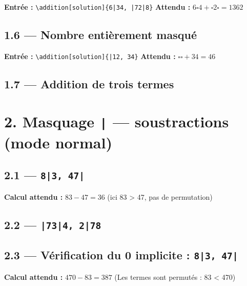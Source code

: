 \documentclass[12pt]{extarticle}
\newcommand{\grise}{\ensuremath{\square}}
\begin{document}
\textbf{Entrée :} \verb!\addition[solution]{6|34, |72|8}!
\quad\textbf{Attendu :} $6\grise 4 + \grise 2\grise = 1362$


\subsection*{1.6 — Nombre entièrement masqué}

\textbf{Entrée :} \verb!\addition[solution]{|12, 34}!
\quad\textbf{Attendu :} $\grise\grise + 34 = 46$


\subsection*{1.7 — Addition de trois termes}


\section*{2. Masquage \texttt{|} — soustractions (mode normal)}

\subsection*{2.1 — \texttt{8|3, 47|}}

\textbf{Calcul attendu :} $83 - 47 = 36$
\quad(ici 83 > 47, pas de permutation)


\subsection*{2.2 — \texttt{|73|4, 2|78}}


\subsection*{2.3 — Vérification du 0 implicite : \texttt{8|3, 47|}}

\textbf{Calcul attendu :} $470 - 83 = 387$
\quad(Les termes sont permutés : 83 < 470)

\end{document}

